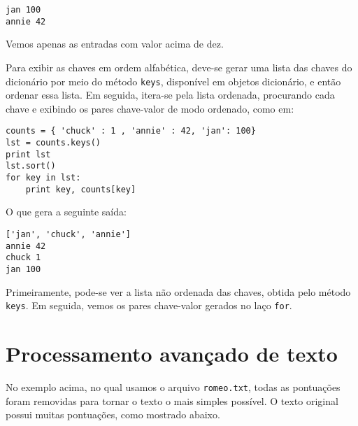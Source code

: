 \beforeverb
\begin{verbatim}
jan 100
annie 42
\end{verbatim}
\afterverb
%
Vemos apenas as entradas com valor acima de dez.

Para exibir as chaves em ordem alfabética, deve-se gerar uma lista das chaves do dicionário por meio do método {\tt keys}, disponível em objetos dicionário, e então ordenar essa lista. Em seguida, itera-se pela lista ordenada, procurando cada chave e exibindo os pares chave-valor de modo ordenado, como em:

\beforeverb
\begin{verbatim}
counts = { 'chuck' : 1 , 'annie' : 42, 'jan': 100}
lst = counts.keys()
print lst
lst.sort()
for key in lst:
    print key, counts[key]
\end{verbatim}
\afterverb
%
O que gera a seguinte saída:

\beforeverb
\begin{verbatim}
['jan', 'chuck', 'annie']
annie 42
chuck 1
jan 100
\end{verbatim}
\afterverb
%
Primeiramente, pode-se ver a lista não ordenada das chaves, obtida pelo método {\tt keys}. Em seguida, vemos os pares chave-valor gerados no laço {\tt for}.

\section{Processamento avançado de texto}


No exemplo acima, no qual usamos o arquivo {\tt romeo.txt}, todas as pontuações foram removidas para tornar o texto o mais simples possível. O texto original possui muitas pontuações, como mostrado abaixo.

